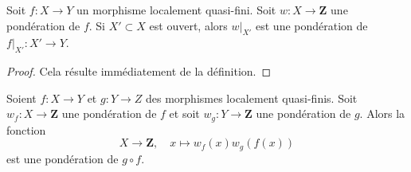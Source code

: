 \begin{lemma}
\label{lemma-weighting-open}
Soit $f : X \to Y$ un morphisme localement quasi-fini. Soit
$w : X \to \mathbf{Z}$ une pondération de $f$. Si $X' \subset X$ est ouvert,
alors $w|_{X'}$ est une pondération de $f|_{X'} : X' \to Y$.
\end{lemma}

\begin{proof}
Cela résulte immédiatement de la définition.
\end{proof}

\begin{lemma}
\label{lemma-weighting-composition}
Soient $f : X \to Y$ et $g : Y \to Z$ des morphismes localement quasi-finis.
Soit $w_f : X \to \mathbf{Z}$ une pondération de $f$ et soit
$w_g : Y \to \mathbf{Z}$ une pondération de $g$. Alors la fonction
$$
X \longrightarrow \mathbf{Z},\quad
x \longmapsto w_f(x) w_g(f(x))
$$
est une pondération de $g \circ f$.
\end{lemma}

